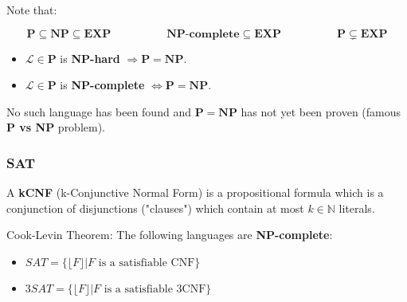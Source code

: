 \documentclass[]{article}
\begin{document}
Note that:

$$
\mathbf{P} \subseteq  \mathbf{NP} \subseteq \mathbf{EXP}
\hspace{5em} 
\textbf{NP-complete} \subseteq \mathbf{EXP}
\hspace{5em} 
\mathbf{P} \subsetneq \mathbf{EXP}
$$

\begin{itemize}
	\item $\mathcal{L} \in \mathbf{P}$ is \textbf{NP-hard} $\Rightarrow \mathbf{P}=\mathbf{N P}$.
	\item $\mathcal{L} \in \mathbf{P}$ is \textbf{NP-complete} $\iff \mathbf{P}=\mathbf{N P}$.
\end{itemize}

No such language has been found and $\mathbf{P}=\mathbf{N P}$ has not yet been proven (famous \textbf{P vs NP} problem).

\subsubsection{SAT}

A \textbf{kCNF} (k-Conjunctive Normal Form) is a propositional formula which is a conjunction of disjunctions ("clauses") which contain at most $k \in \mathbb{N}$ literals.

Cook-Levin Theorem: The following languages are \textbf{NP-complete}:

\begin{itemize}
	\item $SAT = \{\lfloor F \rfloor | F \text{ is a satisfiable CNF}\}$
	\item $3SAT = \{\lfloor F \rfloor | F \text{ is a satisfiable 3CNF}\}$
\end{itemize}
\end{document}
